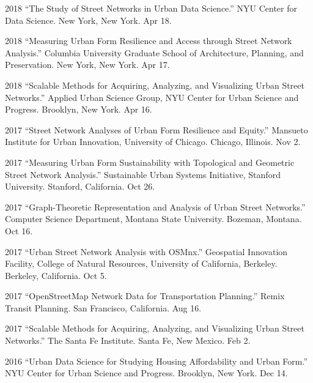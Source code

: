 \documentclass{academiccv}
\begin{document}
\begin{tablist}

\item[2018] \tab \enquote{The Study of Street Networks in Urban Data Science.} NYU Center for Data Science. New York, New York. Apr 18.

\item[2018] \tab \enquote{Measuring Urban Form Resilience and Access through Street Network Analysis.} Columbia University Graduate School of Architecture, Planning, and Preservation. New York, New York. Apr 17.

\item[2018] \tab \enquote{Scalable Methods for Acquiring, Analyzing, and Visualizing Urban Street Networks.} Applied Urban Science Group, NYU Center for Urban Science and Progress. Brooklyn, New York. Apr 16.

\item[2017] \tab \enquote{Street Network Analyses of Urban Form Resilience and Equity.} Mansueto Institute for Urban Innovation, University of Chicago. Chicago, Illinois. Nov 2.

\item[2017] \tab \enquote{Measuring Urban Form Sustainability with Topological and Geometric Street Network Analysis.} Sustainable Urban Systems Initiative, Stanford University. Stanford, California. Oct 26.

\item[2017] \tab \enquote{Graph-Theoretic Representation and Analysis of Urban Street Networks.} Computer Science Department, Montana State University. Bozeman, Montana. Oct 16.

\item[2017] \tab \enquote{Urban Street Network Analysis with OSMnx.} Geospatial Innovation Facility, College of Natural Resources, University of California, Berkeley. Berkeley, California. Oct 5.

\item[2017] \tab \enquote{OpenStreetMap Network Data for Transportation Planning.} Remix Transit Planning. San Francisco, California. Aug 16.

\item[2017] \tab \enquote{Scalable Methods for Acquiring, Analyzing, and Visualizing Urban Street Networks.} The Santa Fe Institute. Santa Fe, New Mexico. Feb 2.

\item[2016] \tab \enquote{Urban Data Science for Studying Housing Affordability and Urban Form.} NYU Center for Urban Science and Progress. Brooklyn, New York. Dec 14.


\end{tablist}
\end{document}
